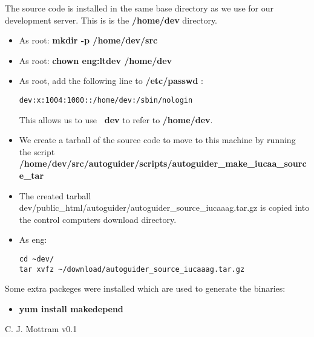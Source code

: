 \documentclass[10pt,a4paper]{article}
\begin{document}
The source code is installed in the same base directory as we use for our development server. This is is the {\bf /home/dev} directory.

\begin{itemize}
\item As root: {\bf mkdir -p /home/dev/src}
\item As root: {\bf chown eng:ltdev /home/dev}
\item As root, add the following line to {\bf /etc/passwd} : 
\begin{verbatim}
dev:x:1004:1000::/home/dev:/sbin/nologin
\end{verbatim}
This allows us to use {\bf ~dev} to refer to {\bf /home/dev}.
\item We create a tarball of the source code to move to this machine by running the script {\bf /home/dev/src/autoguider/scripts/autoguider\_make\_iucaa\_source\_tar}
\item The created tarball \mytilde dev/public\_html/autoguider/autoguider\_source\_iucaaag.tar.gz is copied into the control computers download directory.
\item As eng:
\begin{verbatim}
cd ~dev/
tar xvfz ~/download/autoguider_source_iucaaag.tar.gz
\end{verbatim}
\end{itemize}

Some extra packeges were installed which are used to generate the binaries:

\begin{itemize}
\item {\bf yum install makedepend}
\end{itemize}

\begin{thebibliography}{99}

C. J. Mottram   v0.1

\end{thebibliography}
\end{document}
